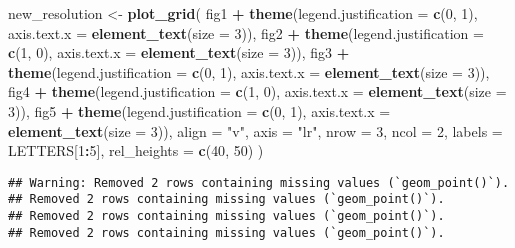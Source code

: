 \documentclass[
]{article}
\newenvironment{Shaded}{\begin{snugshade}}{\end{snugshade}}
\newcommand{\AttributeTok}[1]{\textcolor[rgb]{0.13,0.29,0.53}{#1}}
\newcommand{\DecValTok}[1]{\textcolor[rgb]{0.00,0.00,0.81}{#1}}
\newcommand{\FunctionTok}[1]{\textcolor[rgb]{0.13,0.29,0.53}{\textbf{#1}}}
\newcommand{\NormalTok}[1]{#1}
\newcommand{\OtherTok}[1]{\textcolor[rgb]{0.56,0.35,0.01}{#1}}
\newcommand{\SpecialCharTok}[1]{\textcolor[rgb]{0.81,0.36,0.00}{\textbf{#1}}}
\newcommand{\StringTok}[1]{\textcolor[rgb]{0.31,0.60,0.02}{#1}}
\begin{document}
\begin{Shaded}
\begin{Highlighting}[]
\NormalTok{new\_resolution }\OtherTok{\textless{}{-}} 
  \FunctionTok{plot\_grid}\NormalTok{(}
\NormalTok{  fig1 }\SpecialCharTok{+} \FunctionTok{theme}\NormalTok{(}\AttributeTok{legend.justification =} \FunctionTok{c}\NormalTok{(}\DecValTok{0}\NormalTok{, }\DecValTok{1}\NormalTok{), }\AttributeTok{axis.text.x =} \FunctionTok{element\_text}\NormalTok{(}\AttributeTok{size =} \DecValTok{3}\NormalTok{)),}
\NormalTok{  fig2 }\SpecialCharTok{+} \FunctionTok{theme}\NormalTok{(}\AttributeTok{legend.justification =} \FunctionTok{c}\NormalTok{(}\DecValTok{1}\NormalTok{, }\DecValTok{0}\NormalTok{), }\AttributeTok{axis.text.x =} \FunctionTok{element\_text}\NormalTok{(}\AttributeTok{size =} \DecValTok{3}\NormalTok{)),}
\NormalTok{  fig3 }\SpecialCharTok{+} \FunctionTok{theme}\NormalTok{(}\AttributeTok{legend.justification =} \FunctionTok{c}\NormalTok{(}\DecValTok{0}\NormalTok{, }\DecValTok{1}\NormalTok{), }\AttributeTok{axis.text.x =} \FunctionTok{element\_text}\NormalTok{(}\AttributeTok{size =} \DecValTok{3}\NormalTok{)),}
\NormalTok{  fig4 }\SpecialCharTok{+} \FunctionTok{theme}\NormalTok{(}\AttributeTok{legend.justification =} \FunctionTok{c}\NormalTok{(}\DecValTok{1}\NormalTok{, }\DecValTok{0}\NormalTok{), }\AttributeTok{axis.text.x =} \FunctionTok{element\_text}\NormalTok{(}\AttributeTok{size =} \DecValTok{3}\NormalTok{)),}
\NormalTok{  fig5 }\SpecialCharTok{+} \FunctionTok{theme}\NormalTok{(}\AttributeTok{legend.justification =} \FunctionTok{c}\NormalTok{(}\DecValTok{0}\NormalTok{, }\DecValTok{1}\NormalTok{), }\AttributeTok{axis.text.x =} \FunctionTok{element\_text}\NormalTok{(}\AttributeTok{size =} \DecValTok{3}\NormalTok{)),}
  \AttributeTok{align =} \StringTok{"v"}\NormalTok{, }\AttributeTok{axis =} \StringTok{"lr"}\NormalTok{, }\AttributeTok{nrow =} \DecValTok{3}\NormalTok{, }\AttributeTok{ncol =} \DecValTok{2}\NormalTok{, }\AttributeTok{labels =}\NormalTok{ LETTERS[}\DecValTok{1}\SpecialCharTok{:}\DecValTok{5}\NormalTok{], }\AttributeTok{rel\_heights =} \FunctionTok{c}\NormalTok{(}\DecValTok{40}\NormalTok{, }\DecValTok{50}\NormalTok{)}
\NormalTok{)}
\end{Highlighting}
\end{Shaded}

\begin{verbatim}
## Warning: Removed 2 rows containing missing values (`geom_point()`).
## Removed 2 rows containing missing values (`geom_point()`).
## Removed 2 rows containing missing values (`geom_point()`).
## Removed 2 rows containing missing values (`geom_point()`).
\end{verbatim}
\end{document}
